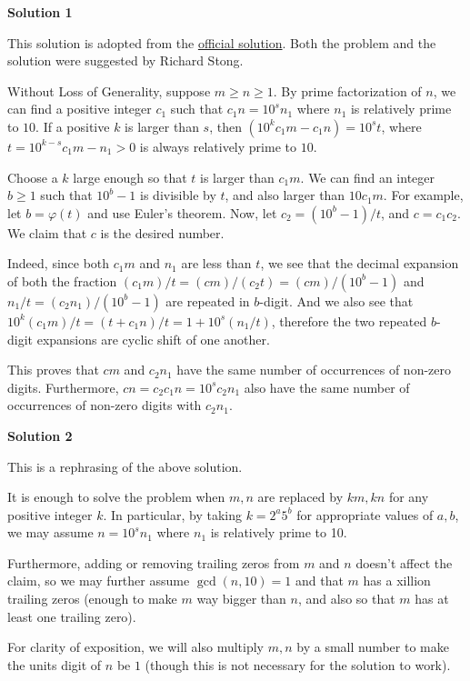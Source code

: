 \begin{enumerate}
 



\textbf{Solution 1}

This solution is adopted from the \href{https://artofproblemsolving.comhttp://web.archive.org/web/20130606075948/http://amc.maa.org/usamo/2013/2013USAMO\_Day1\_Day2\_Final\_S.pdf}{official solution}. Both the problem and the solution were suggested by Richard Stong.

 Without Loss of Generality, suppose $m \geq n \geq 1$. By prime factorization of $n$, we can find a positive integer $c_1$ such that $c_1n=10^s n_1$ where $n_1$ is relatively prime to $10$. If a positive $k$ is larger than $s$, then $(10^k c_1 m - c_1 n)= 10^s t$, where $t=10^{k-s} c_1m-n_1>0$ is always relatively prime to $10$.

 Choose a $k$ large enough so that $t$ is larger than $c_1m$. We can find an integer $b\geq 1$ such that $10^b-1$ is divisible by $t$, and also larger than $10c_1m$. For example, let $b=\varphi(t)$ and use Euler's theorem. Now, let $c_2=(10^b-1)/t$, and $c=c_1c_2$. We claim that $c$ is the desired number.

 Indeed, since both $c_1m$ and $n_1$ are less than $t$, we see that the decimal expansion of both the fraction $(c_1m)/t = (cm)/(c_2t) = (cm)/(10^b-1)$ and $n_1/t=(c_2n_1)/(10^b-1)$ are repeated in $b$-digit. And we also see that $10^k (c_1m)/t = (t+c_1n)/t= 1+10^s (n_1/t)$, therefore the two repeated $b$-digit expansions are cyclic shift of one another.

 This proves that $cm$ and $c_2n_1$ have the same number of occurrences of non-zero digits. Furthermore, $cn = c_2c_1n=10^s c_2n_1$ also have the same number of occurrences of non-zero digits with $c_2n_1$.

 



\textbf{Solution 2}

This is a rephrasing of the above solution.

 It is enough to solve the problem when $m,n$ are replaced by $km,kn$ for any positive integer $k$. In particular, by taking $k=2^a5^b$ for appropriate values of $a,b$, we may assume $n=10^sn_1$ where $n_1$ is relatively prime to 10.

 Furthermore, adding or removing trailing zeros from $m$ and $n$ doesn't affect the claim, so we may further assume $\gcd(n,10)=1$ and that $m$ has a xillion trailing zeros (enough to make $m$ way bigger than $n$, and also so that $m$ has at least one trailing zero).

 For clarity of exposition, we will also multiply $m,n$ by a small number to make the units digit of $n$ be $1$ (though this is not necessary for the solution to work).


\end{enumerate}
